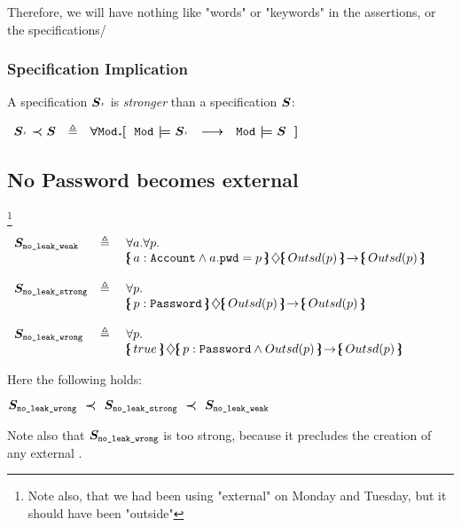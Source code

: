 Therefore, we will have nothing like "words" or "keywords" in the assertions, or the specifications/

\subsubsection{Specification Implication}


\begin{definition}
A specification $\boldmath{S}_{{\texttt{'}}}$ is \emph{stronger} than a specification $\boldmath{S}_{{\texttt{}}}$:

$\begin{array}{lll}
 \boldmath{S}_{{\texttt{'}}}\prec \boldmath{S}_{{\texttt{}}} & \triangleq &  \forall  {\texttt{Mod}}_{{\texttt{}}}. [\ \  {\texttt{Mod}}_{{\texttt{}}} \models \boldmath{S}_{{\texttt{'}}} \ \ \longrightarrow\ \   {\texttt{Mod}}_{{\texttt{}}} \models \boldmath{S}_{{\texttt{}}}\ \ ] \end{array}
$

\end{definition}


\subsection{No Password becomes external}\footnote{Note also, that we had been using "external" on Monday and Tuesday, but it should have been "outside"}

$\begin{array}{lll}
 \Spec{no\_leak\_weak} & \triangleq &  \forall a.  \forall p.\\
 & &   \onlyIf{a:\prg{Account}\wedge a.\prg{pwd}=p}{\outside{p}} {\outside{p}}\   
~ \\
\\
 \Spec{no\_leak\_strong} & \triangleq &  \forall p.\\
 & &   \onlyIf{p:\prg{Password}} {\outside{p}} {\outside{p}}\  \\
 ~ \\
 \Spec{no\_leak\_wrong} & \triangleq\ & \forall p. \\
 & &    \onlyIf{true} {p:\prg{Password} \wedge \outside{p}} {\outside{p}} 

\end{array}
$

\vspace{.1in}
\noindent
Here the following holds:

$\Spec{no\_leak\_wrong}  \ \prec\ \Spec{no\_leak\_strong}  \ \prec \ \Spec{no\_leak\_weak} $

\noindent
Note also that
 $\boldmath{S}_{{\texttt{no\_leak\_wrong}}} $ is too strong, because it precludes the creation of any external  .
 
